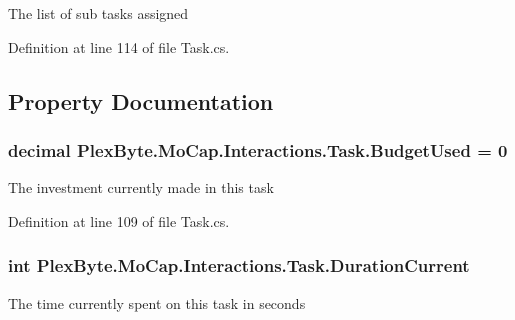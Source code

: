 The list of sub tasks assigned 



Definition at line 114 of file Task.\+cs.



\subsection{Property Documentation}
\subsubsection[{\texorpdfstring{Budget\+Used}{BudgetUsed}}]{\setlength{\rightskip}{0pt plus 5cm}decimal Plex\+Byte.\+Mo\+Cap.\+Interactions.\+Task.\+Budget\+Used = 0\hspace{0.3cm}{\ttfamily [get]}}\hypertarget{class_plex_byte_1_1_mo_cap_1_1_interactions_1_1_task_a982a30703b7b2c3258adad8e09a1ea29}{}\label{class_plex_byte_1_1_mo_cap_1_1_interactions_1_1_task_a982a30703b7b2c3258adad8e09a1ea29}


The investment currently made in this task 



Definition at line 109 of file Task.\+cs.

\subsubsection[{\texorpdfstring{Duration\+Current}{DurationCurrent}}]{\setlength{\rightskip}{0pt plus 5cm}int Plex\+Byte.\+Mo\+Cap.\+Interactions.\+Task.\+Duration\+Current\hspace{0.3cm}{\ttfamily [get]}}\hypertarget{class_plex_byte_1_1_mo_cap_1_1_interactions_1_1_task_a0f087ca6c9a9af79cddb8c409f810526}{}\label{class_plex_byte_1_1_mo_cap_1_1_interactions_1_1_task_a0f087ca6c9a9af79cddb8c409f810526}


The time currently spent on this task in seconds 



